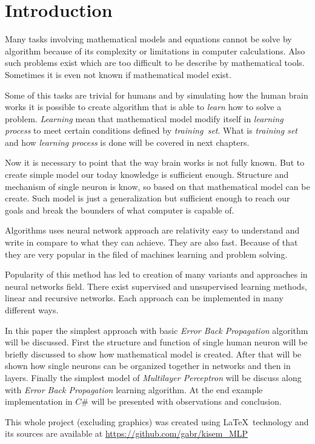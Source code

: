 \section{Introduction}
Many tasks involving mathematical models and equations cannot be solve by algorithm because of its complexity or limitations in computer calculations. Also such problems exist which are too difficult to be describe by mathematical tools. Sometimes it is even not known if mathematical model exist.

Some of this tasks are trivial for humans and by simulating how the human brain works it is possible to create algorithm that is able to \textit{learn} how to solve a problem. \textit{Learning} mean that mathematical model modify itself in \textit{learning process} to meet certain conditions defined by \textit{training~set}. What is \textit{training set} and how \textit{learning process} is done will be covered in next chapters.

Now it is necessary to point that the way brain works is not fully known. But to create simple model our today knowledge is sufficient enough. Structure and mechanism of single neuron is know, so based on that mathematical model can be create. Such model is just a generalization but sufficient enough to reach our goals and break the bounders of what computer is capable of.

Algorithms uses neural network approach are relativity easy to understand and write in compare to what they can achieve. They are also fast. Because of that they are very popular in the filed of machines learning and problem solving.

Popularity of this method has led to creation of many variants and approaches in neural networks field. There exist supervised and unsupervised learning methods, linear and recursive networks. Each approach can be implemented in many different ways.

In this paper the simplest approach with basic \textit{Error Back Propagation} algorithm will be discussed. First the structure and function of single human neuron will be briefly discussed to show how mathematical model is created. After that will be shown how single neurons can be organized together in networks and then in layers. Finally the simplest model of \textit{Multilayer Perceptron} will be discuss along with \textit{Error Back Propagation} learning algorithm. At the end example implementation in $ C\# $ will be presented with observations and conclusion.

\begin{bottompar}
This whole project (excluding graphics) was created using \LaTeX \ technology and its sources are available at \url{https://github.com/gabr/kisem_MLP}

\ 
\end{bottompar}